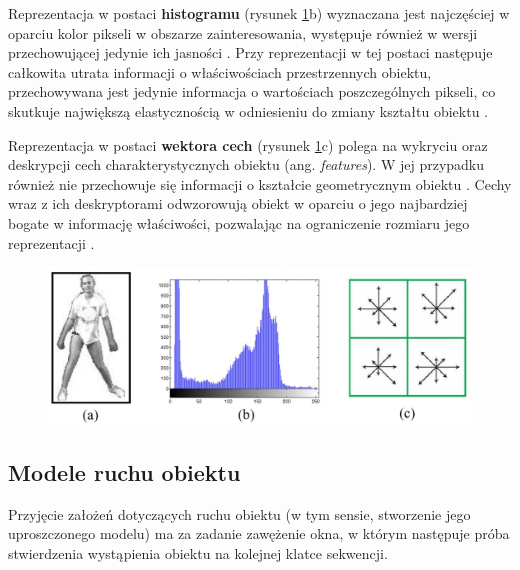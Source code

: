Reprezentacja w postaci \textbf{histogramu} (rysunek \ref{fig:Modele_obiektu_zainteresowania}b) wyznaczana jest najczęściej w oparciu kolor pikseli w obszarze zainteresowania, występuje również w wersji przechowującej jedynie ich jasności \cite{Smeulders2010}. Przy reprezentacji w tej postaci następuje całkowita utrata informacji o właściwościach przestrzennych obiektu, przechowywana jest jedynie informacja o wartościach poszczególnych pikseli, co skutkuje największą elastycznością w odniesieniu do zmiany kształtu obiektu \cite{Smeulders2010}.

Reprezentacja w postaci \textbf{wektora cech} (rysunek \ref{fig:Modele_obiektu_zainteresowania}c) polega na wykryciu oraz deskrypcji cech charakterystycznych obiektu (ang. \textit{features}). W jej przypadku również nie przechowuje się informacji o kształcie geometrycznym obiektu \cite{Smeulders2010}. Cechy wraz z ich deskryptorami odwzorowują obiekt w oparciu o jego najbardziej bogate w informację właściwości, pozwalając na ograniczenie rozmiaru jego reprezentacji \cite{Smeulders2010}.

\begin{figure}[!htb]
	\begin{center}
		\includegraphics[width=12cm]{images/target_appearance_representation.png}
	\end{center}	
\label{fig:Modele_obiektu_zainteresowania}
\end{figure}

\subsection{Modele ruchu obiektu}
\label{subsec:Modele_ruchu_obiektu}

Przyjęcie założeń dotyczących ruchu obiektu (w tym sensie, stworzenie jego uproszczonego modelu) ma za zadanie zawężenie okna, w którym następuje próba stwierdzenia wystąpienia obiektu na kolejnej klatce sekwencji.

